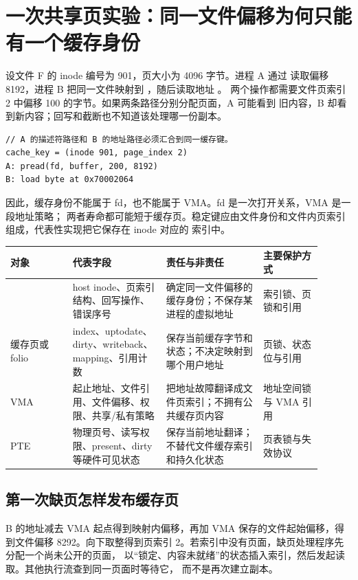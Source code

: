 \section{一次共享页实验：同一文件偏移为何只能有一个缓存身份}

设文件 F 的 inode 编号为 901，页大小为 4096 字节。进程 A 通过  读取偏移
8192，进程 B 把同一文件映射到 ，随后读取地址 。
两个操作都需要文件页索引 2 中偏移 100 的字节。如果两条路径分别分配页面，A 可能看到
旧内容，B 却看到新内容；回写和截断也不知道该处理哪一份副本。

\begin{lstlisting}
// A 的描述符路径和 B 的地址路径必须汇合到同一缓存键。
cache_key = (inode 901, page_index 2)
A: pread(fd, buffer, 200, 8192)
B: load byte at 0x70002064
\end{lstlisting}

因此，缓存身份不能属于 fd，也不能属于 VMA。fd 是一次打开关系，VMA 是一段地址策略；
两者寿命都可能短于缓存页。稳定键应由文件身份和文件内页索引组成，代表性实现把它保存在
inode 对应的  索引中。

\begin{longtable}{|L{0.18\linewidth}|L{0.27\linewidth}|L{0.28\linewidth}|L{0.17\linewidth}|}
\hline
对象 & 代表字段 & 责任与非责任 & 主要保护方式 \\ \hline
{} & host inode、页索引结构、回写操作、错误序号 &
确定同一文件偏移的缓存身份；不保存某进程的虚拟地址 & 索引锁、页锁和引用 \\\tablerowrule
缓存页或 folio & index、uptodate、dirty、writeback、mapping、引用计数 &
保存当前缓存字节和状态；不决定映射到哪个用户地址 & 页锁、状态位与引用 \\\tablerowrule
VMA & 起止地址、文件引用、文件偏移、权限、共享/私有策略 &
把地址故障翻译成文件页索引；不拥有公共缓存页内容 & 地址空间锁与 VMA 引用 \\\tablerowrule
PTE & 物理页号、读写权限、present、dirty 等硬件可见状态 &
保存当前地址翻译；不替代文件缓存索引和持久化状态 & 页表锁与失效协议 \\ \hline
\end{longtable}

\subsection{第一次缺页怎样发布缓存页}

B 的地址减去 VMA 起点得到映射内偏移，再加 VMA 保存的文件起始偏移，得到文件偏移
8292。向下取整得到页索引 2。若索引中没有页面，缺页处理程序先分配一个尚未公开的页面，
以“锁定、内容未就绪”的状态插入索引，然后发起读取。其他执行流查到同一页面时等待它，
而不是再次建立副本。

